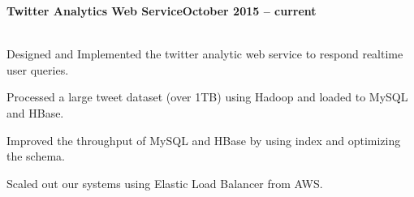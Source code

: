 \documentclass[10pt,margin,line]{resume}
\begin{document}
\begin{resume}
\textbf{Twitter Analytics Web Service}\hfill \textbf{October 2015 -- current} \vspace{0mm}\\\vspace{0mm}\vspace{-7mm}\\\vspace{-1mm}%
\begin{list3}
    \item Designed and Implemented the twitter analytic web service to respond realtime user queries.
    \item Processed a large tweet dataset (over 1TB) using Hadoop and loaded to MySQL and HBase.
    \item Improved the throughput of MySQL and HBase by using index and optimizing the schema.
    \item Scaled out our systems using Elastic Load Balancer from AWS.
\end{list3}







\end{resume}
\end{document}
